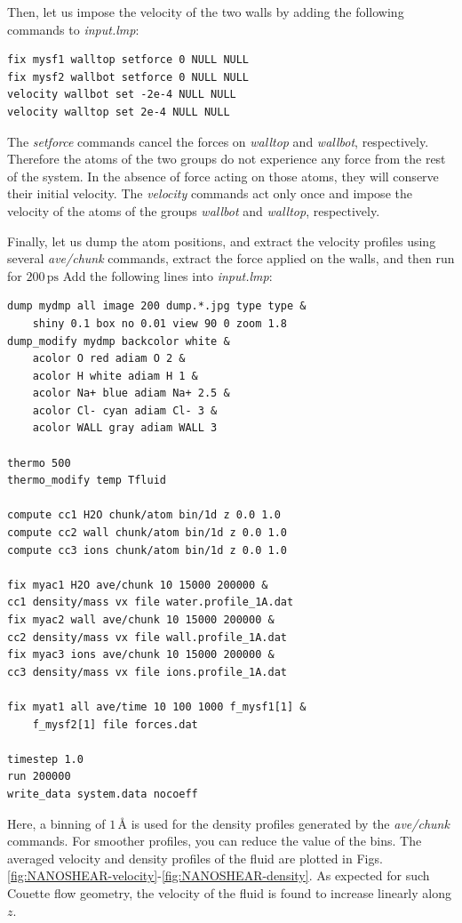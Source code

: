 \documentclass[9pt,tutorial]{livecoms}
\begin{document}
Then, let us impose the velocity of the two walls by adding the following
commands to \textit{input.lmp}:
\begin{lstlisting}
fix mysf1 walltop setforce 0 NULL NULL
fix mysf2 wallbot setforce 0 NULL NULL
velocity wallbot set -2e-4 NULL NULL
velocity walltop set 2e-4 NULL NULL
\end{lstlisting}
The \textit{setforce} commands cancel the forces on \textit{walltop} and
\textit{wallbot}, respectively. Therefore the atoms of the two groups do not
experience any force from the rest of the system. In the absence of force acting
on those atoms, they will conserve their initial velocity. The \textit{velocity}
commands act only once and impose the velocity of the atoms of the groups
\textit{wallbot} and \textit{walltop}, respectively.

Finally, let us dump the atom positions, and extract the velocity profiles using
several \textit{ave/chunk} commands, extract the force applied on the walls, and
then run for $200\,\text{ps}$ Add the following lines into \textit{input.lmp}:
\begin{lstlisting}
dump mydmp all image 200 dump.*.jpg type type &
    shiny 0.1 box no 0.01 view 90 0 zoom 1.8
dump_modify mydmp backcolor white &
    acolor O red adiam O 2 &
    acolor H white adiam H 1 &
    acolor Na+ blue adiam Na+ 2.5 &
    acolor Cl- cyan adiam Cl- 3 &
    acolor WALL gray adiam WALL 3

thermo 500
thermo_modify temp Tfluid

compute cc1 H2O chunk/atom bin/1d z 0.0 1.0
compute cc2 wall chunk/atom bin/1d z 0.0 1.0
compute cc3 ions chunk/atom bin/1d z 0.0 1.0

fix myac1 H2O ave/chunk 10 15000 200000 &
cc1 density/mass vx file water.profile_1A.dat
fix myac2 wall ave/chunk 10 15000 200000 &
cc2 density/mass vx file wall.profile_1A.dat
fix myac3 ions ave/chunk 10 15000 200000 &
cc3 density/mass vx file ions.profile_1A.dat

fix myat1 all ave/time 10 100 1000 f_mysf1[1] &
    f_mysf2[1] file forces.dat

timestep 1.0
run 200000
write_data system.data nocoeff
\end{lstlisting}
Here, a binning of $1\,\text{\AA{}}$ is used for the density profiles generated
by the \textit{ave/chunk} commands. For smoother profiles, you can reduce the value
of the bins. The averaged velocity and density profiles of the fluid are plotted
in Figs.\ref{fig:NANOSHEAR-velocity}-\ref{fig:NANOSHEAR-density}. As expected for
such Couette flow geometry, the velocity of the fluid is found to increase linearly
along $z$.
\end{document}
